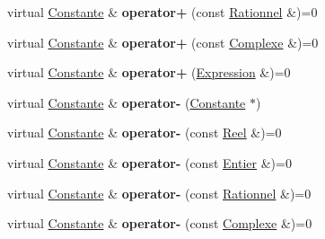 \begin{DoxyCompactItemize}
\item 
\hypertarget{class_constante_ad778cc57ca2edc0bc09dc63455029451}{virtual \hyperlink{class_constante}{Constante} \& {\bfseries operator+} (const \hyperlink{class_rationnel}{Rationnel} \&)=0}\label{class_constante_ad778cc57ca2edc0bc09dc63455029451}

\item 
\hypertarget{class_constante_a753901cb5653de58594c74038536f56b}{virtual \hyperlink{class_constante}{Constante} \& {\bfseries operator+} (const \hyperlink{class_complexe}{Complexe} \&)=0}\label{class_constante_a753901cb5653de58594c74038536f56b}

\item 
\hypertarget{class_constante_a03fc01b8fdf5b8945ae8b72209bc1285}{virtual \hyperlink{class_constante}{Constante} \& {\bfseries operator+} (\hyperlink{class_expression}{Expression} \&)=0}\label{class_constante_a03fc01b8fdf5b8945ae8b72209bc1285}

\item 
\hypertarget{class_constante_a24a763c775e35399bff4441b2f41db12}{virtual \hyperlink{class_constante}{Constante} \& {\bfseries operator-\/} (\hyperlink{class_constante}{Constante} $\ast$)}\label{class_constante_a24a763c775e35399bff4441b2f41db12}

\item 
\hypertarget{class_constante_a6eb6194c90dce85b0e8d55cb39733f6e}{virtual \hyperlink{class_constante}{Constante} \& {\bfseries operator-\/} (const \hyperlink{class_reel}{Reel} \&)=0}\label{class_constante_a6eb6194c90dce85b0e8d55cb39733f6e}

\item 
\hypertarget{class_constante_a0227e180269d318299bf7981a639d196}{virtual \hyperlink{class_constante}{Constante} \& {\bfseries operator-\/} (const \hyperlink{class_entier}{Entier} \&)=0}\label{class_constante_a0227e180269d318299bf7981a639d196}

\item 
\hypertarget{class_constante_aa525b610edbed58856836181b8ea78f8}{virtual \hyperlink{class_constante}{Constante} \& {\bfseries operator-\/} (const \hyperlink{class_rationnel}{Rationnel} \&)=0}\label{class_constante_aa525b610edbed58856836181b8ea78f8}

\item 
\hypertarget{class_constante_aa8f176be374c96fbe1c24716eabf9b07}{virtual \hyperlink{class_constante}{Constante} \& {\bfseries operator-\/} (const \hyperlink{class_complexe}{Complexe} \&)=0}\label{class_constante_aa8f176be374c96fbe1c24716eabf9b07}


\end{DoxyCompactItemize}
